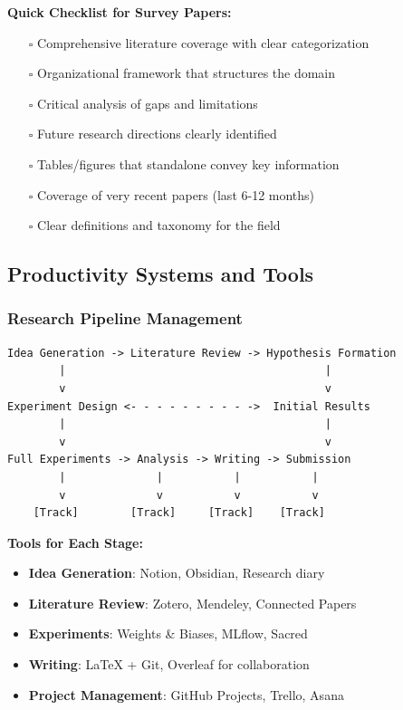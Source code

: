 \documentclass[11pt,a4paper]{article}
\begin{document}
\textbf{Quick Checklist for Survey Papers:}
\begin{enumerate}
    \item[$\square$] Comprehensive literature coverage with clear categorization
    \item[$\square$] Organizational framework that structures the domain
    \item[$\square$] Critical analysis of gaps and limitations
    \item[$\square$] Future research directions clearly identified
    \item[$\square$] Tables/figures that standalone convey key information
    \item[$\square$] Coverage of very recent papers (last 6-12 months)
    \item[$\square$] Clear definitions and taxonomy for the field
\end{enumerate}

\subsection{Productivity Systems and Tools}

\subsubsection{Research Pipeline Management}

\begin{verbatim}
Idea Generation -> Literature Review -> Hypothesis Formation
        |                                        |
        v                                        v
Experiment Design <- - - - - - - - - ->  Initial Results
        |                                        |
        v                                        v
Full Experiments -> Analysis -> Writing -> Submission
        |              |           |           |
        v              v           v           v
    [Track]        [Track]     [Track]    [Track]
\end{verbatim}

\textbf{Tools for Each Stage:}
\begin{itemize}
    \item \textbf{Idea Generation}: Notion, Obsidian, Research diary
    \item \textbf{Literature Review}: Zotero, Mendeley, Connected Papers
    \item \textbf{Experiments}: Weights \& Biases, MLflow, Sacred
    \item \textbf{Writing}: LaTeX + Git, Overleaf for collaboration
    \item \textbf{Project Management}: GitHub Projects, Trello, Asana
\end{itemize}
\end{document}
